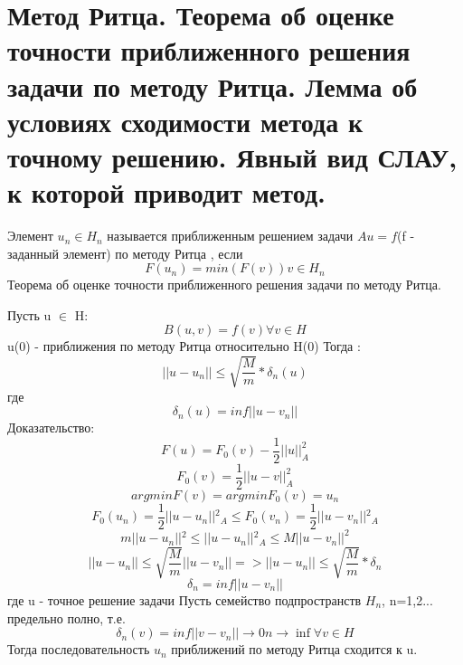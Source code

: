 \documentclass[__main__.tex]{subfiles}
\begin{document}
	
	\section{Метод Ритца. Теорема об оценке точности приближенного решения задачи по методу Ритца. Лемма об условиях сходимости метода к точному решению. Явный вид СЛАУ, к которой приводит метод.}
	
    Элемент $u_n \in H_n$ называется приближенным решением задачи $Au = f$(f - заданный элемент) по методу Ритца , если 
    $$F(u_n)=min(F(v)) v\in H_n$$
	Теорема об оценке точности приближенного решения задачи по методу Ритца. 
	
	Пусть u $\in$ H:
	$$B(u,v)= f(v) \forall v\in H$$
	u(0) - приближения по методу Ритца относительно H(0)
	Тогда :
	$$||u-u_n|| \le \sqrt{\frac{M}{m}}*\delta_n (u)$$
где
$$\delta_n (u) = inf ||u-v_n||$$
Доказательство:
$$F(u)=F_0 (v)-\frac{1}{2} ||u||^2 _A$$
$$F_0(v)=\frac{1}{2} ||u-v||^2 _A$$
$$argminF(v)=argminF_0 (v)=u_n$$
$$F_0 (u_n)=\frac{1}{2}||u-u_n||{^2}{_A}\le F_0 (v_n)=\frac{1}{2}||u-v_n||{^2}{_A} $$
$$m||u-u_n||{^2}\le ||u-u_n||{^2}{_A}\le M||u-v_n||^2$$
$$||u-u_n||\le  \sqrt{\frac{M}{m}}||u-v_n|| => ||u-u_n|| \le \sqrt{\frac{M}{m}}*\delta_n $$
$$
\delta_n = inf ||u-v_n|| 
$$
где u - точное решение задачи
Пусть семейство подпространств $H_n$, n=1,2... предельно полно, т.е. $$\delta_n(v)=inf||v-v_n||\rightarrow 0 n \rightarrow \inf \forall v\in H$$
Тогда последовательность $u_n$ приближений по методу Ритца сходится к u.
\end{document}
